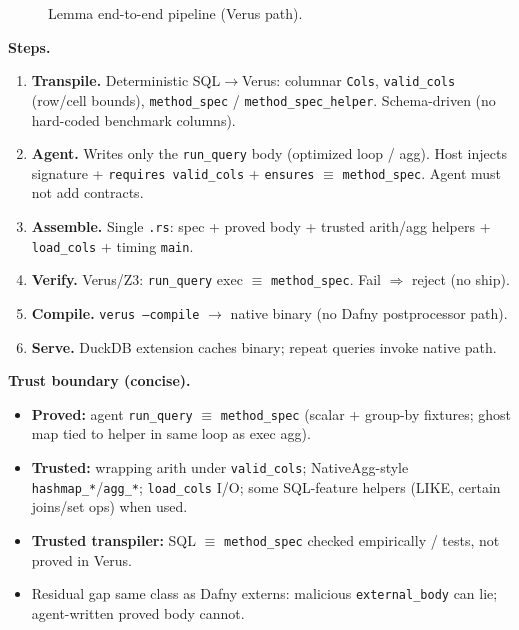 \documentclass[sigconf, nonacm]{acmart}
\begin{document}
\begin{figure}[t]
  \centering
  \caption{Lemma end-to-end pipeline (Verus path).}
  \label{fig:pipeline}
\end{figure}

\noindent\textbf{Steps.}
\begin{enumerate}
  \item \textbf{Transpile.} Deterministic SQL$\to$Verus: columnar \texttt{Cols}, \texttt{valid\_cols} (row/cell bounds), \texttt{method\_spec} / \texttt{method\_spec\_helper}. Schema-driven (no hard-coded benchmark columns).
  \item \textbf{Agent.} Writes only the \texttt{run\_query} body (optimized loop / agg). Host injects signature + \texttt{requires valid\_cols} + \texttt{ensures} $\equiv$ \texttt{method\_spec}. Agent must not add contracts.
  \item \textbf{Assemble.} Single \texttt{.rs}: spec + proved body + trusted arith/agg helpers + \texttt{load\_cols} + timing \texttt{main}.
  \item \textbf{Verify.} Verus/Z3: \texttt{run\_query} exec $\equiv$ \texttt{method\_spec}. Fail $\Rightarrow$ reject (no ship).
  \item \textbf{Compile.} \texttt{verus --compile} $\to$ native binary (no Dafny postprocessor path).
  \item \textbf{Serve.} DuckDB extension caches binary; repeat queries invoke native path.
\end{enumerate}

\noindent\textbf{Trust boundary (concise).}
\begin{itemize}
  \item \textbf{Proved:} agent \texttt{run\_query} $\equiv$ \texttt{method\_spec} (scalar + group-by fixtures; ghost map tied to helper in same loop as exec agg).
  \item \textbf{Trusted:} wrapping arith under \texttt{valid\_cols}; NativeAgg-style \texttt{hashmap\_*}/\texttt{agg\_*}; \texttt{load\_cols} I/O; some SQL-feature helpers (LIKE, certain joins/set ops) when used.
  \item \textbf{Trusted transpiler:} SQL $\equiv$ \texttt{method\_spec} checked empirically / tests, not proved in Verus.
  \item Residual gap same class as Dafny externs: malicious \texttt{external\_body} can lie; agent-written proved body cannot.
\end{itemize}
\end{document}
